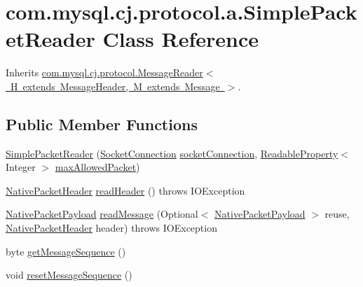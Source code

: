 \hypertarget{classcom_1_1mysql_1_1cj_1_1protocol_1_1a_1_1_simple_packet_reader}{}\section{com.\+mysql.\+cj.\+protocol.\+a.\+Simple\+Packet\+Reader Class Reference}
\label{classcom_1_1mysql_1_1cj_1_1protocol_1_1a_1_1_simple_packet_reader}


Inherits \mbox{\hyperlink{interfacecom_1_1mysql_1_1cj_1_1protocol_1_1_message_reader}{com.\+mysql.\+cj.\+protocol.\+Message\+Reader$<$ H extends Message\+Header, M extends Message $>$}}.

\subsection*{Public Member Functions}
\begin{DoxyCompactItemize}
\item 
\mbox{\hyperlink{classcom_1_1mysql_1_1cj_1_1protocol_1_1a_1_1_simple_packet_reader_a25bebda488bbc840c2ed840a576a76a0}{Simple\+Packet\+Reader}} (\mbox{\hyperlink{interfacecom_1_1mysql_1_1cj_1_1protocol_1_1_socket_connection}{Socket\+Connection}} \mbox{\hyperlink{classcom_1_1mysql_1_1cj_1_1protocol_1_1a_1_1_simple_packet_reader_a6da8bf24cf02fc7519f2080940126bb8}{socket\+Connection}}, \mbox{\hyperlink{interfacecom_1_1mysql_1_1cj_1_1conf_1_1_readable_property}{Readable\+Property}}$<$ Integer $>$ \mbox{\hyperlink{classcom_1_1mysql_1_1cj_1_1protocol_1_1a_1_1_simple_packet_reader_a05df0f4f040b4a5195123a749d231878}{max\+Allowed\+Packet}})
\item 
\mbox{\hyperlink{classcom_1_1mysql_1_1cj_1_1protocol_1_1a_1_1_native_packet_header}{Native\+Packet\+Header}} \mbox{\hyperlink{classcom_1_1mysql_1_1cj_1_1protocol_1_1a_1_1_simple_packet_reader_a2f65d760ce356bbb432f3d8e804a24bc}{read\+Header}} ()  throws I\+O\+Exception 
\item 
\mbox{\hyperlink{classcom_1_1mysql_1_1cj_1_1protocol_1_1a_1_1_native_packet_payload}{Native\+Packet\+Payload}} \mbox{\hyperlink{classcom_1_1mysql_1_1cj_1_1protocol_1_1a_1_1_simple_packet_reader_a088f75ed6453acc78366cfb88b7b15a0}{read\+Message}} (Optional$<$ \mbox{\hyperlink{classcom_1_1mysql_1_1cj_1_1protocol_1_1a_1_1_native_packet_payload}{Native\+Packet\+Payload}} $>$ reuse, \mbox{\hyperlink{classcom_1_1mysql_1_1cj_1_1protocol_1_1a_1_1_native_packet_header}{Native\+Packet\+Header}} header)  throws I\+O\+Exception 
\item 
byte \mbox{\hyperlink{classcom_1_1mysql_1_1cj_1_1protocol_1_1a_1_1_simple_packet_reader_ac89192017a4a7eb78ab9679925857fd6}{get\+Message\+Sequence}} ()
\item 
void \mbox{\hyperlink{classcom_1_1mysql_1_1cj_1_1protocol_1_1a_1_1_simple_packet_reader_a2dc67eb25eaee9e611b6fe3e9876877a}{reset\+Message\+Sequence}} ()
\end{DoxyCompactItemize}
